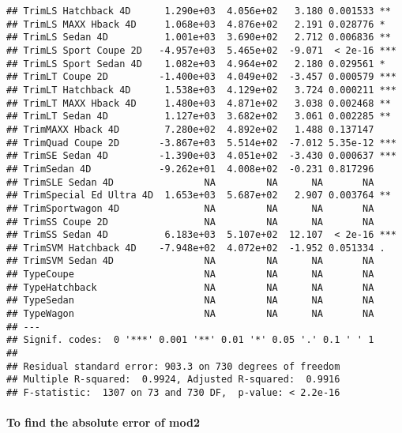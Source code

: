 \documentclass[
]{article}
\newenvironment{Shaded}{\begin{snugshade}}{\end{snugshade}}
\newcommand{\FunctionTok}[1]{\textcolor[rgb]{0.00,0.00,0.00}{#1}}
\newcommand{\NormalTok}[1]{#1}
\newcommand{\OtherTok}[1]{\textcolor[rgb]{0.56,0.35,0.01}{#1}}
\newcommand{\SpecialCharTok}[1]{\textcolor[rgb]{0.00,0.00,0.00}{#1}}
\begin{document}
\begin{verbatim}
## TrimLS Hatchback 4D      1.290e+03  4.056e+02   3.180 0.001533 ** 
## TrimLS MAXX Hback 4D     1.068e+03  4.876e+02   2.191 0.028776 *  
## TrimLS Sedan 4D          1.001e+03  3.690e+02   2.712 0.006836 ** 
## TrimLS Sport Coupe 2D   -4.957e+03  5.465e+02  -9.071  < 2e-16 ***
## TrimLS Sport Sedan 4D    1.082e+03  4.964e+02   2.180 0.029561 *  
## TrimLT Coupe 2D         -1.400e+03  4.049e+02  -3.457 0.000579 ***
## TrimLT Hatchback 4D      1.538e+03  4.129e+02   3.724 0.000211 ***
## TrimLT MAXX Hback 4D     1.480e+03  4.871e+02   3.038 0.002468 ** 
## TrimLT Sedan 4D          1.127e+03  3.682e+02   3.061 0.002285 ** 
## TrimMAXX Hback 4D        7.280e+02  4.892e+02   1.488 0.137147    
## TrimQuad Coupe 2D       -3.867e+03  5.514e+02  -7.012 5.35e-12 ***
## TrimSE Sedan 4D         -1.390e+03  4.051e+02  -3.430 0.000637 ***
## TrimSedan 4D            -9.262e+01  4.008e+02  -0.231 0.817296    
## TrimSLE Sedan 4D                NA         NA      NA       NA    
## TrimSpecial Ed Ultra 4D  1.653e+03  5.687e+02   2.907 0.003764 ** 
## TrimSportwagon 4D               NA         NA      NA       NA    
## TrimSS Coupe 2D                 NA         NA      NA       NA    
## TrimSS Sedan 4D          6.183e+03  5.107e+02  12.107  < 2e-16 ***
## TrimSVM Hatchback 4D    -7.948e+02  4.072e+02  -1.952 0.051334 .  
## TrimSVM Sedan 4D                NA         NA      NA       NA    
## TypeCoupe                       NA         NA      NA       NA    
## TypeHatchback                   NA         NA      NA       NA    
## TypeSedan                       NA         NA      NA       NA    
## TypeWagon                       NA         NA      NA       NA    
## ---
## Signif. codes:  0 '***' 0.001 '**' 0.01 '*' 0.05 '.' 0.1 ' ' 1
## 
## Residual standard error: 903.3 on 730 degrees of freedom
## Multiple R-squared:  0.9924, Adjusted R-squared:  0.9916 
## F-statistic:  1307 on 73 and 730 DF,  p-value: < 2.2e-16
\end{verbatim}

\hypertarget{to-find-the-absolute-error-of-mod2}{%
\paragraph{To find the absolute error of
mod2}\label{to-find-the-absolute-error-of-mod2}}

\begin{Shaded}
\end{Shaded}
\end{document}
